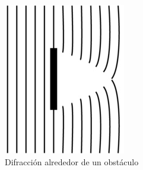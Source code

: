 \begin{figure}[H]
  \centering
  \includegraphics[scale=0.5]{imagenes/difraccion_alrededor.png}
  \caption{Difracción alrededor de un obstáculo\cite{texasdiffraction}}
\end{figure}
